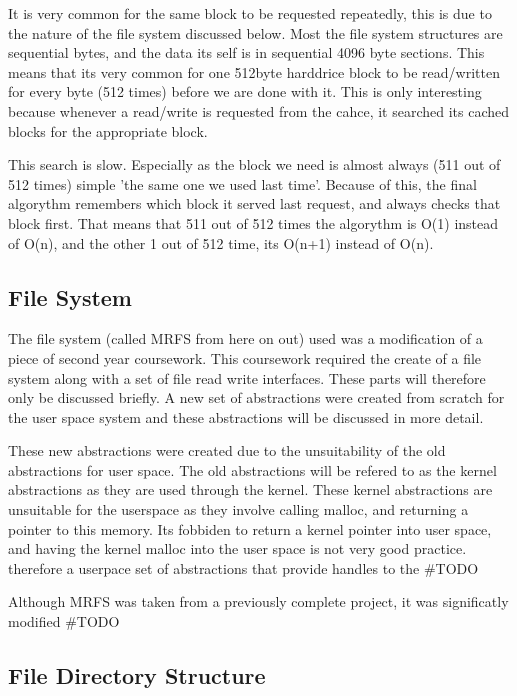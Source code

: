 \documentclass[a4paper]{report}
\begin{document}
It is very common for the same block to be requested repeatedly, this is due to the nature of the file system discussed below. Most the file system structures are sequential bytes, and the data its self is in sequential 4096 byte sections. This means that its very common for one 512byte harddrice block to be read/written for every byte (512 times) before we are done with it. This is only interesting because whenever a read/write is requested from the cahce, it searched its cached blocks for the appropriate block.

This search is slow. Especially as the block we need is almost always (511 out of 512 times) simple 'the same one we used last time'. Because of this, the final algorythm remembers which block it served last request, and always checks that block first. That means that 511 out of 512 times the algorythm is O(1) instead of O(n), and the other 1 out of 512 time, its O(n+1) instead of O(n).





\subsection{File System}

The file system (called MRFS from here on out) used was a modification of a piece of second year coursework. This coursework required the create of a file system along with a set of file read write interfaces. These parts will therefore only be discussed briefly. A new set of abstractions were created from scratch for the user space system and these abstractions will be discussed in more detail.

These new abstractions were created due to the unsuitability of the old abstractions for user space. The old abstractions will be refered to as the kernel abstractions as they are used through the kernel. These kernel abstractions are unsuitable for the userspace as they involve calling malloc, and returning a pointer to this memory. Its fobbiden to return a kernel pointer into user space, and having the kernel malloc into the user space is not very good practice. therefore a userpace set of abstractions that provide handles to the #TODO

Although MRFS was taken from a previously complete project, it was significatly modified #TODO

\subsection{File Directory Structure}
\end{document}
